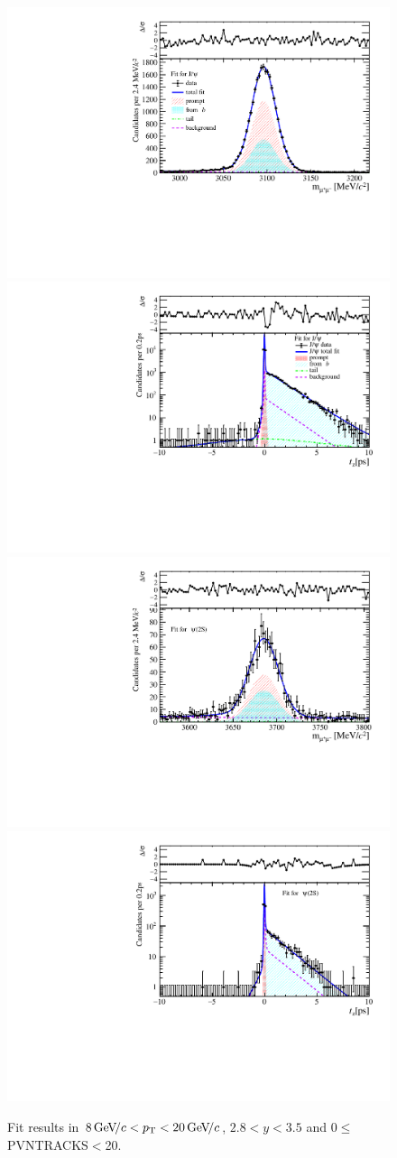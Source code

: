 \begin{figure}[H]
\begin{center}
\includegraphics[width=0.47\linewidth]{pdf/Jpsi/drawmass/n1y2pt5.pdf}
\includegraphics[width=0.47\linewidth]{pdf/Jpsi/2DFit/n1y2pt5.pdf}
\vspace*{-0.5cm}
\includegraphics[width=0.47\linewidth]{pdf/Psi2S/drawmass/n1y2pt5.pdf}
\includegraphics[width=0.47\linewidth]{pdf/Psi2S/2DFit/n1y2pt5.pdf}
\vspace*{-0.5cm}
\end{center}
\caption{Fit results in $8\text{\,Ge\kern -0.1em V\!/}c<p_{\mathrm{T}}<20\text{\,Ge\kern -0.1em V\!/}c$, $2.8<y<3.5$ and 0$\leq$PVNTRACKS$<$20.}
\label{Fitn1y2pt5}
\end{figure}
